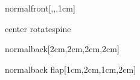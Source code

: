 \documentclass[
    coverwidth=16cm,
    coverheight=24cm,
    spinewidth=15mm,
	flapwidth=0cm,    %
    wrapwidth=0mm,
	bleed=5mm
    ]{bookcover}
\begin{document}
\begin{bookcover}
\begin{bookcoverelement}{normal}{front}[,,,1cm]
    {\fontsize{18pt}{18pt}\selectfont
    }

\end{bookcoverelement}

\begin{bookcoverelement}{center rotate}{spine}
    \color{yellow!60!black}\huge\sffamily\bfseries
\end{bookcoverelement}

\begin{bookcoverelement}{normal}{back}[2cm,2cm,2cm,2cm]
    \color{white}\kant[1]
\end{bookcoverelement}

\begin{bookcoverelement}{normal}{back flap}[1cm,2cm,1cm,2cm]
    \color{white}\kant[3]
\end{bookcoverelement}

\end{bookcover}
\end{document}
